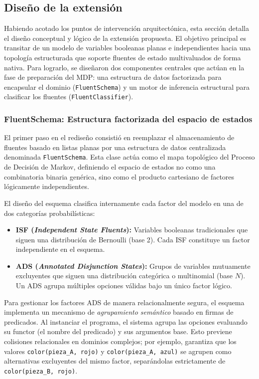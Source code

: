 \subsection{Diseño de la extensión}
\label{sec:di-diseno-extension}

Habiendo acotado los puntos de intervención arquitectónica, esta sección detalla el diseño conceptual y lógico de la extensión propuesta. El objetivo principal es transitar de un modelo de variables booleanas planas e independientes hacia una topología estructurada que soporte fluentes de estado multivaluados de forma nativa. Para lograrlo, se diseñaron dos componentes centrales que actúan en la fase de preparación del MDP: una estructura de datos factorizada para encapsular el dominio (\texttt{FluentSchema}) y un motor de inferencia estructural para clasificar los fluentes (\texttt{FluentClassifier}).

\subsubsection{FluentSchema: Estructura factorizada del espacio de estados}
\label{sec:di-fluentschema}

El primer paso en el rediseño consistió en reemplazar el almacenamiento de fluentes basado en listas planas por una estructura de datos centralizada denominada \texttt{FluentSchema}. Esta clase actúa como el mapa topológico del Proceso de Decisión de Markov, definiendo el espacio de estados no como una combinatoria binaria genérica, sino como el producto cartesiano de factores lógicamente independientes.

El diseño del esquema clasifica internamente cada factor del modelo en una de dos categorías probabilísticas:
\begin{itemize}
    \item \textbf{ISF (\textit{Independent State Fluents}):} Variables booleanas tradicionales que siguen una distribución de Bernoulli (base 2). Cada ISF constituye un factor independiente en el esquema.
    \item \textbf{ADS (\textit{Annotated Disjunction States}):} Grupos de variables mutuamente excluyentes que siguen una distribución categórica o multinomial (base $N$). Un ADS agrupa múltiples opciones válidas bajo un único factor lógico.
\end{itemize}

Para gestionar los factores ADS de manera relacionalmente segura, el esquema implementa un mecanismo de \textit{agrupamiento semántico} basado en firmas de predicados. Al instanciar el programa, el sistema agrupa las opciones evaluando su functor (el nombre del predicado) y sus argumentos base. Esto previene colisiones relacionales en dominios complejos; por ejemplo, garantiza que los valores \texttt{color(pieza\_A, rojo)} y \texttt{color(pieza\_A, azul)} se agrupen como alternativas excluyentes del mismo factor, separándolas estrictamente de \texttt{color(pieza\_B, rojo)}. 

